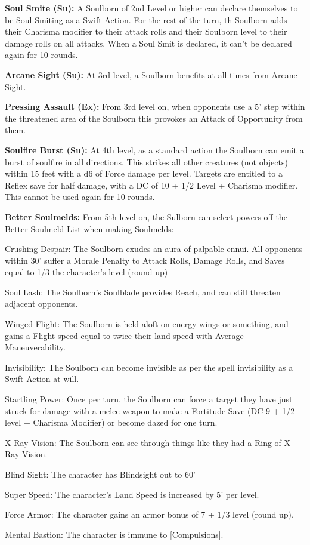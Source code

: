 \textbf{Soul Smite (Su):} A Soulborn of 2nd Level or higher can declare themselves to be Soul Smiting as a Swift Action. For the rest of the turn, th Soulborn adds their Charisma modifier to their attack rolls and their Soulborn level to their damage rolls on all attacks. When a Soul Smit is declared, it can't be declared again for 10 rounds.

\textbf{Arcane Sight (Su):} At 3rd level, a Soulborn benefits at all times from Arcane Sight. 

\textbf{Pressing Assault (Ex):} From 3rd level on, when opponents use a 5' step within the threatened area of the Soulborn this provokes an Attack of Opportunity from them. 

\textbf{Soulfire Burst (Su):} At 4th level, as a standard action the Soulborn can emit a burst of soulfire in all directions. This strikes all other creatures (not objects) within 15 feet with a d6 of Force damage per level. Targets are entitled to a Reflex save for half damage, with a DC of 10 + 1/2 Level + Charisma modifier. This cannot be used again for 10 rounds. 

\textbf{Better Soulmelds:} From 5th level on, the Sulborn can select powers off the Better Soulmeld List when making Soulmelds: 
\begin{itemize*}
\item Crushing Despair: The Soulborn exudes an aura of palpable ennui. All opponents within 30' suffer a Morale Penalty to Attack Rolls, Damage Rolls, and Saves equal to 1/3 the character's level (round up) 
\item Soul Lash: The Soulborn's Soulblade provides Reach, and can still threaten adjacent opponents. 
\item Winged Flight: The Soulborn is held aloft on energy wings or something, and gains a Flight speed equal to twice their land speed with Average Maneuverability. 
\item Invisibility: The Soulborn can become invisible as per the spell invisibility as a Swift Action at will. 
\item Startling Power: Once per turn, the Soulborn can force a target they have just struck for damage with a melee weapon to make a Fortitude Save (DC 9 + 1/2 level + Charisma Modifier) or become dazed for one turn. 
\item X-Ray Vision: The Soulborn can see through things like they had a Ring of X-Ray Vision. 
\item Blind Sight: The character has Blindsight out to 60' 
\item Super Speed: The character's Land Speed is increased by 5' per level. 
\item Force Armor: The character gains an armor bonus of 7 + 1/3 level (round up). 
\item Mental Bastion: The character is immune to [Compulsions].
\end{itemize*}

